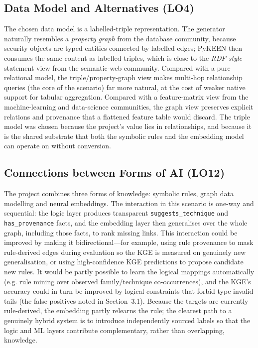 \documentclass{article}
\begin{document}
\subsection{Data Model and Alternatives (LO4)}
The chosen data model is a labelled-triple representation. The generator
naturally resembles a \emph{property graph} from the database community, because
security objects are typed entities connected by labelled edges; PyKEEN then
consumes the same content as labelled triples, which is close to the
\emph{RDF-style} statement view from the semantic-web community. Compared with a
pure relational model, the triple/property-graph view makes multi-hop
relationship queries (the core of the scenario) far more natural, at the cost of
weaker native support for tabular aggregation. Compared with a feature-matrix
view from the machine-learning and data-science communities, the graph view
preserves explicit relations and provenance that a flattened feature table would
discard. The triple model was chosen because the project's value lies in
relationships, and because it is the shared substrate that both the symbolic
rules and the embedding model can operate on without conversion.

\subsection{Connections between Forms of AI (LO12)}
The project combines three forms of knowledge: symbolic rules, graph data
modelling and neural embeddings. The interaction in this scenario is one-way and
sequential: the logic layer produces transparent \texttt{suggests\_technique}
and \texttt{has\_provenance} facts, and the embedding layer then generalises over
the whole graph, including those facts, to rank missing links. This interaction
could be improved by making it bidirectional---for example, using rule
provenance to mask rule-derived edges during evaluation so the KGE is measured
on genuinely new generalisation, or using high-confidence KGE predictions to
propose candidate new rules. It would be partly possible to learn the logical
mappings automatically (e.g. rule mining over observed family/technique
co-occurrences), and the KGE's accuracy could in turn be improved by logical
constraints that forbid type-invalid tails (the false positives noted in
Section~3.1). Because the targets are currently rule-derived, the embedding
partly relearns the rule; the clearest path to a genuinely hybrid system is to
introduce independently sourced labels so that the logic and ML layers
contribute complementary, rather than overlapping, knowledge.
\end{document}
